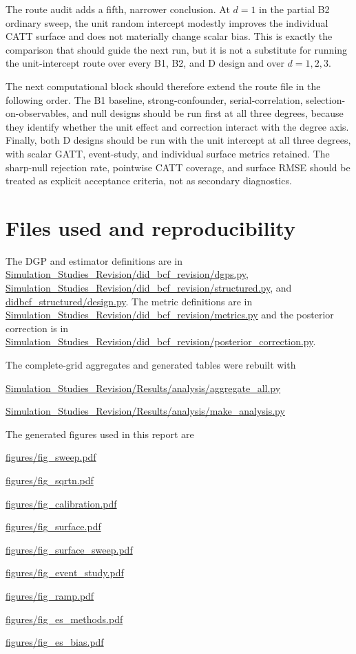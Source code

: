 \documentclass[11pt]{article}
\begin{document}
The route audit adds a fifth, narrower conclusion. At $d=1$ in the partial B2
ordinary sweep, the unit random intercept modestly improves the individual
CATT surface and does not materially change scalar bias. This is exactly the
comparison that should guide the next run, but it is not a substitute for
running the unit-intercept route over every B1, B2, and D design and over
$d=1,2,3$.

The next computational block should therefore extend the route file in the
following order. The B1 baseline, strong-confounder, serial-correlation,
selection-on-observables, and null designs should be run first at all three
degrees, because they identify whether the unit effect and correction interact
with the degree axis. Finally, both D designs should be run with the unit
intercept at all three degrees, with scalar GATT, event-study, and individual
surface metrics retained. The sharp-null rejection rate, pointwise CATT
coverage, and surface RMSE should be treated as explicit acceptance criteria,
not as secondary diagnostics.

\appendix
\section{Files used and reproducibility}

The DGP and estimator definitions are in
\url{Simulation_Studies_Revision/did_bcf_revision/dgps.py},
\url{Simulation_Studies_Revision/did_bcf_revision/structured.py}, and
\url{didbcf_structured/design.py}. The metric definitions are in
\url{Simulation_Studies_Revision/did_bcf_revision/metrics.py} and the
posterior correction is in
\url{Simulation_Studies_Revision/did_bcf_revision/posterior_correction.py}.

The complete-grid aggregates and generated tables were rebuilt with
\begin{center}
\url{Simulation_Studies_Revision/Results/analysis/aggregate_all.py}\par
\url{Simulation_Studies_Revision/Results/analysis/make_analysis.py}
\end{center}
The generated figures used in this report are
\begin{center}
\url{figures/fig_sweep.pdf}\par
\url{figures/fig_sqrtn.pdf}\par
\url{figures/fig_calibration.pdf}\par
\url{figures/fig_surface.pdf}\par
\url{figures/fig_surface_sweep.pdf}\par
\url{figures/fig_event_study.pdf}\par
\url{figures/fig_ramp.pdf}\par
\url{figures/fig_es_methods.pdf}\par
\url{figures/fig_es_bias.pdf}
\end{center}
\end{document}
